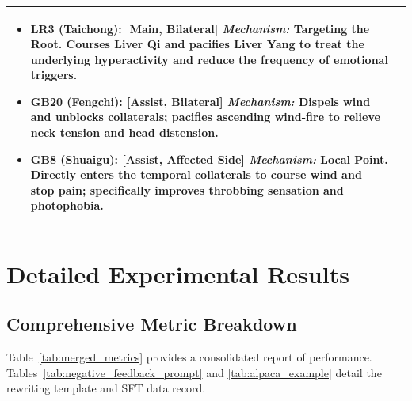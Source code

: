 \documentclass[preprint,5p,times,twocolumn,fleqn]{elsarticle}
\begin{document}
\begin{table}[htbpt]
\begin{tabularx}{\textwidth}{@{}l X@{}}
\begin{itemize}[leftmargin=1.2em, nosep, before=\vspace{-0.5em}, after=\vspace{-0.5em}]
      \item \textbf{LR3 (Taichong):} [Main, Bilateral] \newline
      \textit{Mechanism:} \textbf{Targeting the Root.} Courses Liver Qi and pacifies Liver Yang to treat the underlying hyperactivity and reduce the frequency of emotional triggers.
      
      \item \textbf{GB20 (Fengchi):} [Assist, Bilateral] \newline
      \textit{Mechanism:} Dispels wind and unblocks collaterals; pacifies ascending wind-fire to relieve neck tension and head distension.
      
      \item \textbf{GB8 (Shuaigu):} [Assist, Affected Side] \newline
      \textit{Mechanism:} \textbf{Local Point.} Directly enters the temporal collaterals to course wind and stop pain; specifically improves throbbing sensation and photophobia.
    \end{itemize} \\
    \bottomrule
  \end{tabularx}
\end{table}

\FloatBarrier

\section{Detailed Experimental Results}
\label{app:results}

\subsection{Comprehensive Metric Breakdown}
Table~\ref{tab:merged_metrics} provides a consolidated report of performance. Tables~\ref{tab:negative_feedback_prompt} and \ref{tab:alpaca_example} detail the rewriting template and SFT data record.
\end{document}
